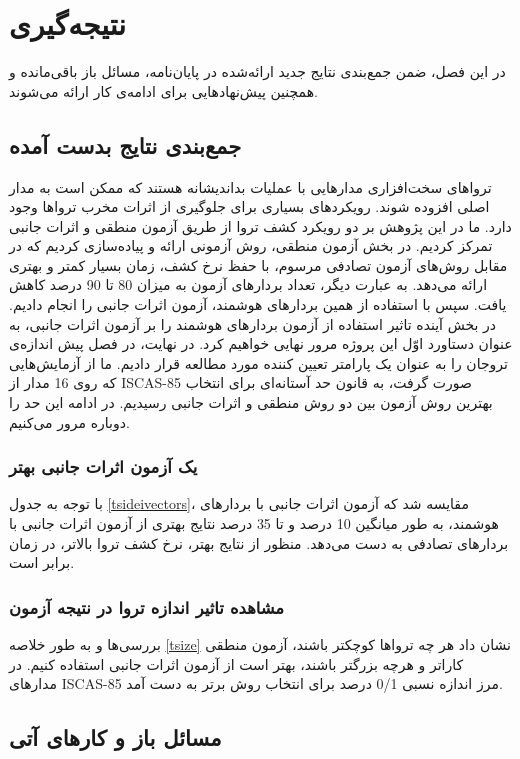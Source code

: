 
\chapter{نتیجه‌گیری}

در این فصل، ضمن جمع‌بندی نتایج جدید ارائه‌شده در پایان‌نامه، 
مسائل باز باقی‌مانده و همچنین پیش‌نهادهایی برای ادامه‌ی کار ارائه می‌شوند.

\section{جمع‌بندی نتایج بدست آمده}
تروا‌های سخت‌افزاری مدارهایی با عملیات بداندیشانه هستند که ممکن است به مدار اصلی افزوده شوند. رویکردهای بسیاری برای جلوگیری از اثرات مخرب ترواها وجود دارد. ما در این پژوهش بر دو رویکرد کشف تروا از طریق آزمون منطقی و اثرات جانبی تمرکز کردیم. در بخش آزمون منطقی، روش آزمونی ارائه و پیاده‌سازی کردیم که در مقابل روش‌های آزمون تصادفی مرسوم، با حفظ نرخ کشف، زمان بسیار کمتر و بهتری ارائه می‌دهد. به عبارت دیگر، تعداد بردارهای آزمون به میزان 80 تا 90 درصد کاهش یافت. سپس با استفاده از همین بردارهای هوشمند، آزمون اثرات جانبی را انجام دادیم. در بخش آینده تاثیر استفاده از آزمون بردارهای هوشمند را بر آزمون اثرات جانبی، به عنوان دستاورد اوّل این پروژه مرور نهایی خواهیم کرد. در نهایت، در فصل پیش اندازه‌ی تروجان را به عنوان یک پارامتر تعیین کننده مورد مطالعه قرار دادیم. ما از آزمایش‌هایی که روی 16 مدار از ISCAS-85 صورت گرفت، به قانون حد آستانه‌ای برای انتخاب بهترین روش آزمون بین دو روش منطقی و اثرات جانبی رسیدیم. در ادامه این حد را دوباره مرور می‌کنیم.
\subsection{یک آزمون اثرات جانبی بهتر}
با توجه به جدول \ref{tsideivectors}، مقایسه شد که آزمون اثرات جانبی با بردارهای هوشمند، به طور میانگین 10 درصد و تا 35 درصد نتایج بهتری از آزمون اثرات جانبی با بردارهای تصادفی به دست می‌دهد. منظور از نتایج بهتر، نرخ کشف تروا بالاتر، در زمان برابر است.
\subsection{مشاهده تاثیر اندازه تروا در نتیجه آزمون}
بررسی‌ها و به طور خلاصه \ref{tsize} نشان داد هر چه تروا‌ها کوچکتر باشند، آزمون منطقی کارا‌تر و هرچه بزرگتر باشند، بهتر است از آزمون اثرات جانبی استفاده کنیم. در مدارهای ISCAS-85 مرز اندازه نسبی 0/1 درصد برای انتخاب روش برتر به دست آمد.

\section{مسائل باز و کارهای آتی}

